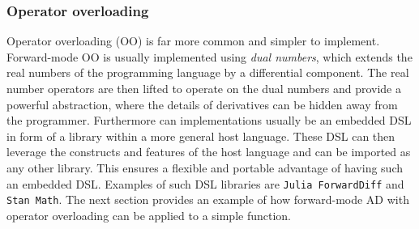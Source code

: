 	\subsubsection*{Operator overloading}
	Operator overloading (OO) is far more common and simpler to implement.
	Forward-mode OO is usually implemented using \emph{dual numbers}, which extends
	the real numbers 
	of the programming language by a differential component. The real number
	operators are then lifted to
	operate on the dual numbers and provide a powerful abstraction, where the
	details of derivatives can 
	be hidden away from the programmer. Furthermore can implementations usually be
	an embedded DSL in form of a library 
	within a more general host language. These DSL can then leverage the constructs
	and features of the host language and can be imported
	as any other library. This ensures a flexible and portable advantage of having
	such an embedded DSL. Examples of such DSL libraries are 
	\texttt{Julia ForwardDiff}\cite{RevelsLubinPapamarkou2016} and \texttt{Stan
		Math}\cite{DBLP:journals/corr/CarpenterHBLLB15}. 
	The next section provides an example of how forward-mode AD with operator
	overloading can be applied to a simple
	function. 
	

	
	
